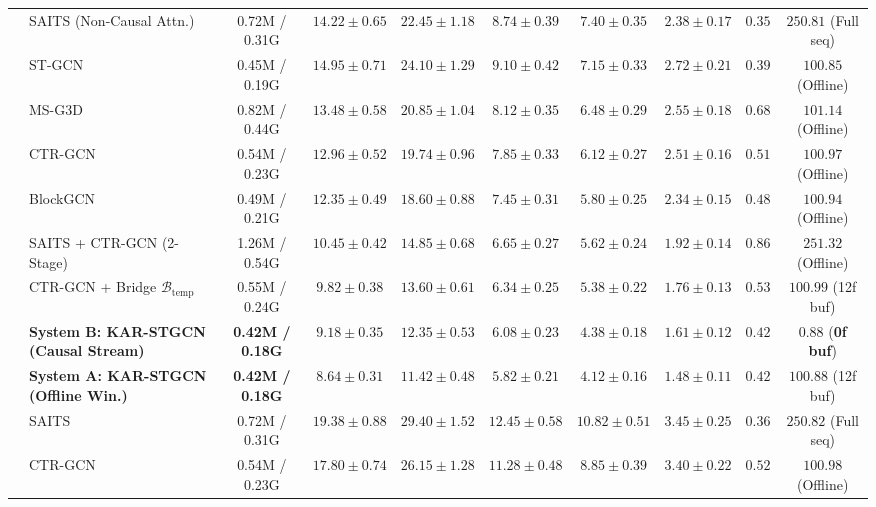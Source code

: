 \documentclass[10pt,twocolumn]{article}
\begin{document}
\begin{table}[!t]
{\begin{tabular}{llcccccccc}
 & SAITS \cite{du2023saits} (Non-Causal Attn.) & 0.72M / 0.31G & $14.22 \pm 0.65$ & $22.45 \pm 1.18$ & $8.74 \pm 0.39$ & $7.40 \pm 0.35$ & $2.38 \pm 0.17$ & $0.35$ & $250.81$ (Full seq) \\
 & ST-GCN \cite{yan2018spatial} & 0.45M / 0.19G & $14.95 \pm 0.71$ & $24.10 \pm 1.29$ & $9.10 \pm 0.42$ & $7.15 \pm 0.33$ & $2.72 \pm 0.21$ & $0.39$ & $100.85$ (Offline) \\
 & MS-G3D \cite{liu2020msg3d} & 0.82M / 0.44G & $13.48 \pm 0.58$ & $20.85 \pm 1.04$ & $8.12 \pm 0.35$ & $6.48 \pm 0.29$ & $2.55 \pm 0.18$ & $0.68$ & $101.14$ (Offline) \\
 & CTR-GCN \cite{chen2021ctrgcn} & 0.54M / 0.23G & $12.96 \pm 0.52$ & $19.74 \pm 0.96$ & $7.85 \pm 0.33$ & $6.12 \pm 0.27$ & $2.51 \pm 0.16$ & $0.51$ & $100.97$ (Offline) \\
 & BlockGCN \cite{zhou2024blockgcn} & 0.49M / 0.21G & $12.35 \pm 0.49$ & $18.60 \pm 0.88$ & $7.45 \pm 0.31$ & $5.80 \pm 0.25$ & $2.34 \pm 0.15$ & $0.48$ & $100.94$ (Offline) \\
 & SAITS + CTR-GCN (2-Stage) & 1.26M / 0.54G & $10.45 \pm 0.42$ & $14.85 \pm 0.68$ & $6.65 \pm 0.27$ & $5.62 \pm 0.24$ & $1.92 \pm 0.14$ & $0.86$ & $251.32$ (Offline) \\
 & CTR-GCN + Bridge $\mathcal{B}_{\text{temp}}$ & 0.55M / 0.24G & $9.82 \pm 0.38$ & $13.60 \pm 0.61$ & $6.34 \pm 0.25$ & $5.38 \pm 0.22$ & $1.76 \pm 0.13$ & $0.53$ & $100.99$ (12f buf) \\
 & \textbf{System B: KAR-STGCN (Causal Stream)} & \textbf{0.42M / 0.18G} & $9.18 \pm 0.35$ & $12.35 \pm 0.53$ & $6.08 \pm 0.23$ & $4.38 \pm 0.18$ & $1.61 \pm 0.12$ & $\mathbf{0.42}$ & $\mathbf{0.88}$ (\textbf{0f buf}) \\
 & \textbf{System A: KAR-STGCN (Offline Win.)} & \textbf{0.42M / 0.18G} & $\mathbf{8.64 \pm 0.31}$ & $\mathbf{11.42 \pm 0.48}$ & $\mathbf{5.82 \pm 0.21}$ & $\mathbf{4.12 \pm 0.16}$ & $\mathbf{1.48 \pm 0.11}$ & $\mathbf{0.42}$ & $100.88$ (12f buf) \\
\midrule
{} 
 & SAITS \cite{du2023saits} & 0.72M / 0.31G & $19.38 \pm 0.88$ & $29.40 \pm 1.52$ & $12.45 \pm 0.58$ & $10.82 \pm 0.51$ & $3.45 \pm 0.25$ & $\mathbf{0.36}$ & $250.82$ (Full seq) \\
 & CTR-GCN \cite{chen2021ctrgcn} & 0.54M / 0.23G & $17.80 \pm 0.74$ & $26.15 \pm 1.28$ & $11.28 \pm 0.48$ & $8.85 \pm 0.39$ & $3.40 \pm 0.22$ & $0.52$ & $100.98$ (Offline) \\

\end{tabular}}
\end{table}
\end{document}
